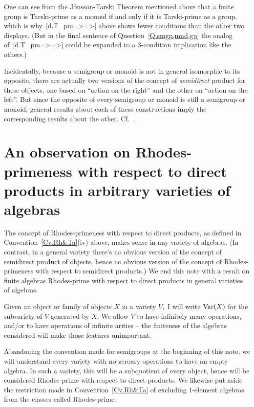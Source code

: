\documentclass{amsart}
\numberwithin{equation}{section}
\numberwithin{theorem}{section}
\begin{document}
One can see from the J\'onsson-Tarski Theorem mentioned above
that a finite group is Tarski-prime as a monoid
if and only if it is Tarski-prime as a group, which is
why~\eqref{d.T_pm=>=>} above shows fewer conditions
than the other two displays.
(But in the final sentence of Question~\ref{Q.smgp,mnd,gp}
the analog of~\eqref{d.T_pm=>=>} could be
expanded to a $\!3\!$-condition implication like the others.)

Incidentally, because a semigroup or monoid is not
in general isomorphic to its opposite, there are actually two
versions of the concept of {\em semidirect} product for these objects,
one based on ``action on the right'' and the other
on ``action on the left''.
But since the opposite of every semigroup
or monoid is still a semigroup or monoid, general results
about each of these constructions imply
the corresponding results about the other.
Cf.~\cite[p.\,24, first sentence of next-to-last paragraph]{RS}.

\section{An observation on Rhodes-primeness with respect to direct\\
products in arbitrary varieties of algebras}\label{S.Rprime&var}

The concept of Rhodes-primeness with respect to
direct products, as defined in Convention~\ref{Cv.Rh&Ta}(iv) above,
makes sense in any variety of algebras.
(In contrast, in a general variety there's no obvious
version of the concept of semidirect product of objects, hence
no obvious version of the concept of
Rhodes-primeness with respect to semidirect products.)
We end this note with a result on finite algebras Rhodes-prime
with respect to direct products in general varieties of algebras.

Given an object or family of objects $X$ in a variety $V,$
I will write $\textup{Var}(X)$ for the subvariety of $V$
generated by $X.$
We allow $V$ to have infinitely many operations, and/or to
have operations of infinite arities --
the finiteness of the algebras considered
will make those features unimportant.

Abandoning the convention made for semigroups at the beginning
of this note, we will understand every variety with no zeroary
operations to have an empty algebra.
In such a variety, this will be a subquotient of every object,
hence will be considered Rhodes-prime with respect to direct products.
We likewise put aside the restriction made in
Convention~\ref{Cv.Rh&Ta} of excluding $\!1\!$-element
algebras from the classes called Rhodes-prime.
\end{document}
